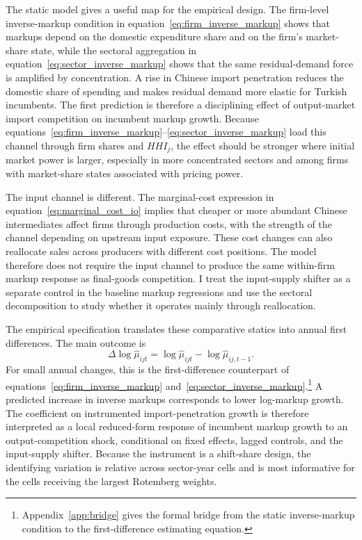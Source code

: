 ﻿\documentclass[12pt]{article}
\begin{document}
The static model gives a useful map for the empirical design. The firm-level inverse-markup condition in equation~\eqref{eq:firm_inverse_markup} shows that markups depend on the domestic expenditure share and on the firm's market-share state, while the sectoral aggregation in equation~\eqref{eq:sector_inverse_markup} shows that the same residual-demand force is amplified by concentration. A rise in Chinese import penetration reduces the domestic share of spending and makes residual demand more elastic for Turkish incumbents. The first prediction is therefore a disciplining effect of output-market import competition on incumbent markup growth. Because equations~\eqref{eq:firm_inverse_markup}--\eqref{eq:sector_inverse_markup} load this channel through firm shares and \(HHI_j\), the effect should be stronger where initial market power is larger, especially in more concentrated sectors and among firms with market-share states associated with pricing power.

The input channel is different. The marginal-cost expression in equation~\eqref{eq:marginal_cost_io} implies that cheaper or more abundant Chinese intermediates affect firms through production costs, with the strength of the channel depending on upstream input exposure. These cost changes can also reallocate sales across producers with different cost positions. The model therefore does not require the input channel to produce the same within-firm markup response as final-goods competition. I treat the input-supply shifter as a separate control in the baseline markup regressions and use the sectoral decomposition to study whether it operates mainly through reallocation.

The empirical specification translates these comparative statics into annual first differences. The main outcome is
\[
\Delta \log \hat\mu_{ijt}
=
\log \hat\mu_{ijt} - \log \hat\mu_{ij,t-1}.
\]
For small annual changes, this is the first-difference counterpart of equations~\eqref{eq:firm_inverse_markup} and~\eqref{eq:sector_inverse_markup}.\footnote{Appendix~\ref{app:bridge} gives the formal bridge from the static inverse-markup condition to the first-difference estimating equation.} A predicted increase in inverse markups corresponds to lower log-markup growth. The coefficient on instrumented import-penetration growth is therefore interpreted as a local reduced-form response of incumbent markup growth to an output-competition shock, conditional on fixed effects, lagged controls, and the input-supply shifter. Because the instrument is a shift-share design, the identifying variation is relative across sector-year cells and is most informative for the cells receiving the largest Rotemberg weights.
\end{document}
